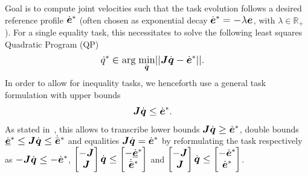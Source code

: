 Goal is to compute joint velocities such that the task evolution follows a desired reference profile
$\dot{\mbm{e}}^*$ (often chosen as exponential decay $\dot{\mbm{e}}^*= -\lambda \mbm{e}$, with $\lambda
\in \mathbb{R}_+$). For a single equality task, this necessitates to solve the following least
squares Quadratic Program (QP)
%
\begin{align}\label{eq:QP}
  \dot{q}^* &\in \mbox{arg} \; \underset{\footnotesize\dot{\mbm{q}}\normalsize}{\mbox{min}}||\mbm{J}\dot{\mbm{q}}-\dot{\mbm{e}}^*||.
\end{align}
%
In order to allow for inequality tasks, we henceforth use a general task formulation with upper
bounds 
\begin{align}\label{eq:task}
  \mbm{J}\dot{\mbm{q}}&\leq \dot{\mbm{e}}^*.
\end{align}
%
As stated in~\cite{Esca14}, this allows to transcribe lower bounds $\mbm{J}\dot{\mbm{q}} \geq
  \dot{\mbm{e}}^*$, double bounds $\dot{\underline{\mbm{e}}}^* \leq \mbm{J}\dot{\mbm{q}} \leq
  \dot{\bar{\mbm{e}}}^*$ and equalities $\mbm{J}\dot{\mbm{q}}=\dot{\mbm{e}}^*$ by reformulating the task
respectively as
$-\mbm{J}\dot{\mbm{q}} \leq -\dot{\mbm{e}}^*$, $\begin{bmatrix} -\mbm{J} \\
  \mbm{J} \end{bmatrix}\dot{\mbm{q}} \leq \begin{bmatrix} -\dot{\underline{\mbm{e}}}^*
  \\ \dot{\bar{\mbm{e}}}^* \end{bmatrix}$ and $\begin{bmatrix} -\mbm{J} \\
  \mbm{J} \end{bmatrix}\dot{\mbm{q}} \leq \begin{bmatrix} -\dot{\mbm{e}}^* \\
  \dot{\mbm{e}}^* \end{bmatrix}$.

